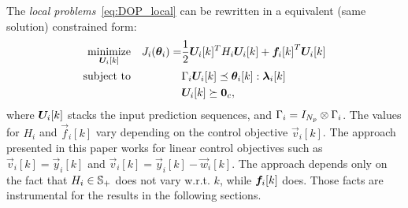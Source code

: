 \documentclass{ifacconf}  %
\begin{document}
The \emph{local problems}~\eqref{eq:DOP_local} can be rewritten in a equivalent (same solution) constrained \qp{} form:
  \begin{subequations}\label{eq:quadratic_case}
    \begin{align}
      \label{eq:4}
      \underset{\Uik}{\mathrm{minimize}}&&\small J_{i}(\vec{\theta}_{i})=&\frac{1}{2} \Uik^T H_i\Uik +{\fik}^T\Uik\\
      \mathrm{subject~ to}&&&\bar{\Gamma}_{i}\Uik\preceq\vec{\theta}_{i}[k]:\vec{\lambda}_{i}[k]\label{eq:constraints}\\
                                        &&&\Uik\succeq\0_{c},
    \end{align}
  \end{subequations}
where ${\Uik}$ stacks the input prediction sequences, and
${\relax{\Gamma}_{i}=I_{N_{p}}\mathbin{\otimes}\Gamma_{i}}$.
The values for $H_{i}$ and $\vec{f}_{i}[k]$ vary depending on the control objective $\vec{v}_{i}[k]$.
The approach presented in this paper works for linear control objectives such as ${\vec{v}_{i}[k]=\vec{y}_{i}[k]}$ and ${\vec{v}_{i}[k]=\vec{y}_{i}[k]-\vec{w}_{i}[k]}$.
The approach depends only on the fact that ${H_{i}\in\mathbb{S}_{+}}$ does not vary w.r.t. $k$, while $\fik$ does. Those facts are instrumental for the results in the following sections.

\end{document}
